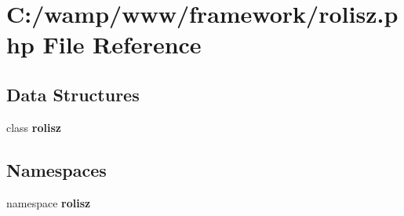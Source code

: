 \section{C:/wamp/www/framework/rolisz.php File Reference}
\label{rolisz_8php}
\subsection*{Data Structures}
\begin{DoxyCompactItemize}
\item 
class {\bf rolisz}
\end{DoxyCompactItemize}
\subsection*{Namespaces}
\begin{DoxyCompactItemize}
\item 
namespace {\bf rolisz}
\end{DoxyCompactItemize}

